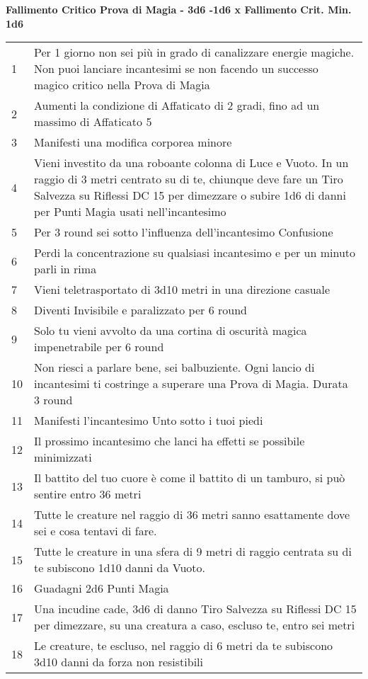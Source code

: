 \documentclass[landscape,10pt,a4paper]{article}
\begin{document}
\begin{multicols}{2}
\begin{dmbox}[title=Fallimento Critico Prova di Magia - pagina \pageref{magiefallimentocriticonellaprovadimagia}]
\textbf{Fallimento Critico Prova di Magia - 3d6 -1d6 x Fallimento Crit. Min. 1d6}
\begin{tabularx}{1\linewidth}{lX}
1 & Per 1 giorno non sei più in grado di canalizzare energie magiche. Non puoi lanciare incantesimi se non facendo un successo magico critico nella Prova di Magia\\
2 & Aumenti la condizione di Affaticato di 2 gradi, fino ad un massimo di Affaticato 5\\
3 & Manifesti una modifica corporea minore\\
4 & Vieni investito da una roboante colonna di Luce e Vuoto. In un raggio di 3 metri centrato su di te, chiunque deve fare un Tiro Salvezza su Riflessi DC 15 per dimezzare o subire 1d6 di danni per Punti Magia usati nell'incantesimo\\
5 & Per 3 round sei sotto l'influenza dell'incantesimo Confusione\\
6 & Perdi la concentrazione su qualsiasi incantesimo e per un minuto parli in rima\\
7 & Vieni teletrasportato di 3d10 metri in una direzione casuale\\
8 & Diventi Invisibile e paralizzato per 6 round\\
9 & Solo tu vieni avvolto da una cortina di oscurità magica impenetrabile per 6 round\\
10 & Non riesci a parlare bene, sei balbuziente. Ogni lancio di incantesimi ti costringe a superare una Prova di Magia. Durata 3 round\\
11 & Manifesti l'incantesimo Unto sotto i tuoi piedi\\
12 & Il prossimo incantesimo che lanci ha effetti se possibile minimizzati\\
13 & Il battito del tuo cuore è come il battito di un tamburo, si può sentire entro 36 metri\\
14 & Tutte le creature nel raggio di 36 metri sanno esattamente dove sei e cosa tentavi di fare.\\
15 & Tutte le creature in una sfera di 9 metri di raggio centrata su di te subiscono 1d10 danni da Vuoto.\\
16 & Guadagni 2d6 Punti Magia\\
17 & Una incudine cade, 3d6 di danno Tiro Salvezza su Riflessi DC 15 per dimezzare, su una creatura a caso, escluso te, entro sei metri\\
18 & Le creature, te escluso, nel raggio di 6 metri da te subiscono 3d10 danni da forza non resistibili
\end{tabularx}
\end{dmbox}



\end{multicols}
\end{document}
